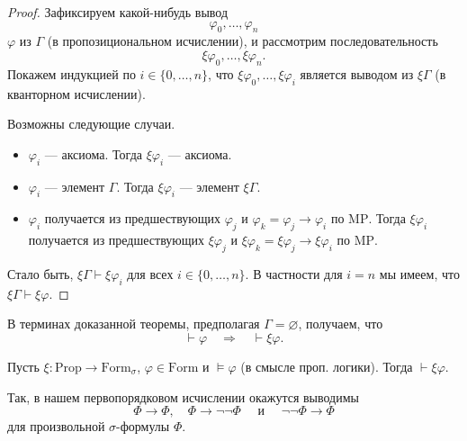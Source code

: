 \documentclass[12pt,a4paper]{article}
\newcommand{\Prop}{\ensuremath{\mathrm{Prop}}\xspace}
\newcommand{\Formul}{\ensuremath{\mathrm{Form}}\xspace}
\begin{document}
    \begin{proof}
        Зафиксируем какой-нибудь вывод
        \[\varphi_0, \dots, \varphi_n\]
        $\varphi$ из $\Gamma$ (в пропозициональном исчислении), и рассмотрим последовательность
        \[\xi \varphi_0, \dots, \xi \varphi_n.\]
        Покажем индукцией по $i \in \{0, \dots, n\}$, что $\xi \varphi_0, \dots, \xi \varphi_i$ является выводом из $\xi \Gamma$ (в кванторном исчислении).

        Возможны следующие случаи.
        \begin{itemize}
            \item $\varphi_i$ --- аксиома. Тогда $\xi \varphi_i$ --- аксиома.
            \item $\varphi_i$ --- элемент $\Gamma$. Тогда $\xi \varphi_i$ --- элемент $\xi \Gamma$.
            \item $\varphi_i$ получается из предшествующих $\varphi_j$ и $\varphi_k = \varphi_j \rightarrow \varphi_i$ по $\mathrm{MP}$. Тогда $\xi \varphi_i$ получается из предшествующих $\xi \varphi_j$ и $\xi \varphi_k = \xi \varphi_j \rightarrow \xi \varphi_i$ по $\mathrm{MP}$.
        \end{itemize}

        Стало быть, $\xi \Gamma \vdash \xi \varphi_i$ для всех $i \in \{0, \dots, n\}$. В частности для $i = n$ мы имеем, что $\xi \Gamma \vdash \xi \varphi$.
    \end{proof}

    \begin{corollary}
        В терминах доказанной теоремы, предполагая $\Gamma = \varnothing$, получаем, что
        \[
            \vdash \varphi
            \quad \Longrightarrow \quad
            \vdash \xi \varphi.
        \]
    \end{corollary}

    \begin{corollary}
        Пусть $\xi: \Prop \to \Formul_\sigma$, $\varphi \in \Formul$ и $\vDash \varphi$ (в смысле проп. логики). Тогда $\vdash \xi \varphi$.
    \end{corollary}

    \begin{example}
        Так, в нашем первопорядковом исчислении окажутся выводимы
        \[\Phi \rightarrow \Phi, \quad \Phi \rightarrow \neg \neg \Phi \quad \text{ и } \quad \neg \neg \Phi \rightarrow \Phi\]
        для произвольной $\sigma$-формулы $\Phi$.
    \end{example}
\end{document}
